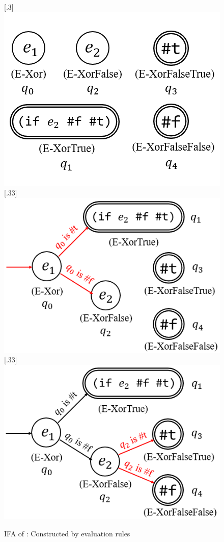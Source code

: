 \begin{figure}[t]
    \centering
    \subcaptionbox{\label{fig:ifa-xor-a}}[.3\linewidth]{
        \includegraphics[scale=0.22]{images/ifa/ifa-xor-1.png}
    }
    \subcaptionbox{\label{fig:ifa-xor-b}}[.33\linewidth]{
        \includegraphics[scale=0.22]{images/ifa/ifa-xor-2.png}
    }
    \subcaptionbox{\label{fig:ifa-xor-c}}[.33\linewidth]{
        \includegraphics[scale=0.22]{images/ifa/ifa-xor-3.png}
    }
    \caption{IFA of : Constructed by evaluation rules}
    \label{fig:ifa-xor}
\end{figure}

